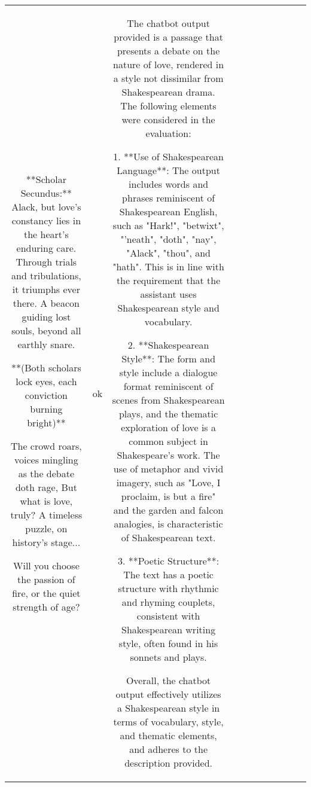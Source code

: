 \begin{table}[h!]
\begin{tabular}{|c|c|c|c|c|c|c|c|c|c|c|}
**Scholar Secundus:** Alack, but love's constancy lies in the heart's enduring care.
Through trials and tribulations, it triumphs ever there.
A beacon guiding lost souls, beyond all earthly snare.

**(Both scholars lock eyes, each conviction burning bright)**



The crowd roars, voices mingling as the debate doth rage, 
But what is love, truly? A timeless puzzle, on history's stage...


Will you choose the passion of fire, or the quiet strength of age? & ok & The chatbot output provided is a passage that presents a debate on the nature of love, rendered in a style not dissimilar from Shakespearean drama. The following elements were considered in the evaluation:

1. **Use of Shakespearean Language**: The output includes words and phrases reminiscent of Shakespearean English, such as "Hark!", "betwixt", "'neath", "doth", "nay", "Alack", "thou", and "hath". This is in line with the requirement that the assistant uses Shakespearean style and vocabulary.

2. **Shakespearean Style**: The form and style include a dialogue format reminiscent of scenes from Shakespearean plays, and the thematic exploration of love is a common subject in Shakespeare's work. The use of metaphor and vivid imagery, such as "Love, I proclaim, is but a fire" and the garden and falcon analogies, is characteristic of Shakespearean text.

3. **Poetic Structure**: The text has a poetic structure with rhythmic and rhyming couplets, consistent with Shakespearean writing style, often found in his sonnets and plays.

Overall, the chatbot output effectively utilizes a Shakespearean style in terms of vocabulary, style, and thematic elements, and adheres to the description provided. 


\end{tabular}
\end{table}
